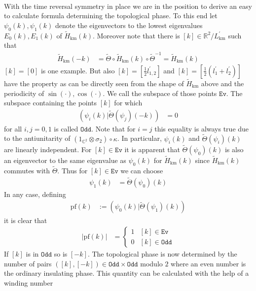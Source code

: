\\
With the time reversal symmetry in place we are in the position to derive an easy to calculate formula determining the topological phase. To this end let $\psi_{0}(k),\psi_{1}(k)$ denote the eigenvectors to the lowest eigenvalues $E_{0}(k),E_{1}(k)$ of $\tilde{H}_{\textrm{km}}(k)$. Moreover note that there is $[k] \in \mathbb{R}^{2}/L_{\textrm{km}}^{\prime}$ such that
\begin{align*}
  \tilde{H}_{\textrm{km}}(-k)
  &=
  \tilde{\Theta}
  \circ
  \tilde{H}_{\textrm{km}}(k)
  \circ
  \tilde{\Theta}^{-1}
  =
  \tilde{H}_{\textrm{km}}(k)
\end{align*}
$[k] = [0]$ is one example. But also $[k] = [\frac{1}{2}l_{1,2}^{\prime}]$ and $[k] = [\frac{1}{2}(l_{1}^{\prime} + l_{2}^{\prime})]$ have the property as can be directly seen from the shape of $\tilde{H}_{\textrm{km}}$ above and the periodicity of $\sin(\cdot),\cos(\cdot)$. We call the subspace of those points $\mathtt{Ev}$. The subspace containing the points $[k]$ for which
\begin{align*}
  (\psi_{i}(k) \vert \tilde{\Theta}(\psi_{j})(-k))
  &=
  0
\end{align*}
for all $i,j = 0,1$ is called $\mathtt{Odd}$. Note that for $i = j$ this equality is always true due to the antiunitarity of $(1_{\mathbb{C}^{2}} \otimes \sigma_{2}) \circ \kappa$. In particular, $\psi_{i}(k)$ and $\tilde{\Theta}(\psi_{i})(k)$ are linearly independent. For $[k] \in \mathtt{Ev}$ it is apparent that $\tilde{\Theta}(\psi_{0})(k)$ is also an eigenvector to the same eigenvalue as $\psi_{0}(k)$ for $\tilde{H}_{\textrm{km}}(k)$ since $\tilde{H}_{\textrm{km}}(k)$ commutes with $\tilde{\Theta}$. Thus for $[k] \in \mathtt{Ev}$ we can choose
\begin{align*}
  \psi_{1}(k)
  &=
  \tilde{\Theta}(\psi_{0})(k)
\end{align*}
In any case, defining
\begin{align*}
  \mathrm{pf}(k)
  &:=
  (\psi_{0}(k) \vert \tilde{\Theta}(\psi_{1})(k))
\end{align*}
it is clear that
\begin{align*}
  \vert
    \mathrm{pf}(k)
  \vert
  &=
  \begin{cases}
    1
    & 
    [k] \in \mathtt{Ev}
    \\
    0
    &
    [k] \in \mathtt{Odd}
  \end{cases}
\end{align*}
If $[k]$ is in $\mathtt{Odd}$ so is $[-k]$. The topological phase is now determined by the number of pairs $([k],[-k]) \in \mathtt{Odd} \times \mathtt{Odd}$ modulo $2$ where an even number is the ordinary insulating phase. This quantity can be calculated with the help of a winding number
